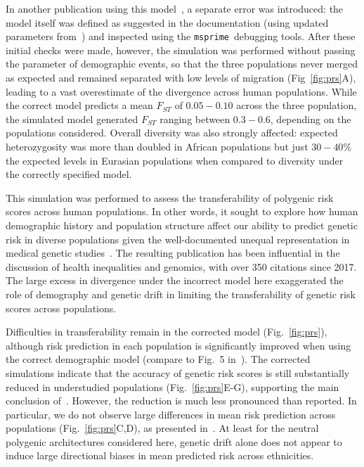 \documentclass{article}
\newcommand{\msprime}[0]{\texttt{msprime}}
\begin{document}
In another publication using this model~\citep{martin2017human},
a separate error was introduced: the model itself was defined as suggested
in the documentation (using updated parameters
from~\citet{gravel2011demographic}) and inspected
using the \msprime\ debugging tools.
After these initial checks were made, however, the simulation
was performed without passing the parameter of demographic events,
so that the three populations
never merged as expected and remained separated with low levels of migration   (Fig~\ref{fig:prs}A),
leading to a vast overestimate of the divergence across human populations.
While the correct model predicts a mean $F_{ST}$ of
$0.05 - 0.10$ across the three population, the simulated model generated $F_{ST}$
ranging between $0.3 - 0.6$, depending on the populations considered.
Overall diversity was also strongly affected: expected heterozygosity was more than
doubled in African populations but just $30-40\%$ the expected
levels in Eurasian populations when compared to diversity under the correctly specified model.

This simulation was performed to assess the
transferability of polygenic risk scores across human populations. In other words, it sought to
explore how human demographic history and population structure affect our ability
to predict genetic risk in diverse populations given the well-documented unequal representation
in medical genetic studies~\citep{popejoy2016genomics}. The resulting publication has been
influential in the discussion of health inequalities and genomics, with over 350 citations since 2017.
The large excess in divergence under the incorrect model here exaggerated the role of demography
and genetic drift in limiting the transferability of genetic risk scores across populations.

Difficulties in transferability remain in the corrected model (Fig.~\ref{fig:prs}), although
risk prediction in each population is significantly improved when using the correct
demographic model (compare to Fig.~5 in~\citet{martin2017human}).
The corrected simulations indicate that the accuracy of genetic risk scores is still
substantially reduced in understudied populations (Fig.~\ref{fig:prs}E-G),
supporting the main conclusion of~\citet{martin2017human}.
However, the reduction is much less pronounced than reported.
In particular, we do not observe large differences in mean risk prediction
across populations (Fig.~\ref{fig:prs}C,D), as presented in~\citet{martin2017human}.
At least for the neutral polygenic architectures considered here, genetic drift alone
does not appear to induce large directional biases in mean predicted risk across ethnicities.
\end{document}
